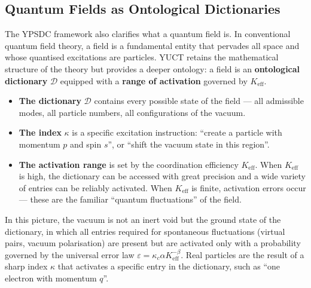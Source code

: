 \documentclass[12pt,a4paper]{article}
\theoremstyle{remark}
\begin{document}
	\medskip
	
	
	\subsection{Quantum Fields as Ontological Dictionaries}
	
	The YPSDC framework also clarifies what a quantum field is.
	In conventional quantum field theory, a field is a fundamental
	entity that pervades all space and whose quantised excitations
	are particles.  YUCT retains the mathematical structure of the
	theory but provides a deeper ontology: a field is an
	\textbf{ontological dictionary} $\mathcal{D}$ equipped with a
	\textbf{range of activation} governed by $K_{\mathrm{eff}}$.
	
	\begin{itemize}[leftmargin=*]
		\item \textbf{The dictionary} $\mathcal{D}$ contains every
		possible state of the field --- all admissible modes,
		all particle numbers, all configurations of the vacuum.
		\item \textbf{The index} $\kappa$ is a specific excitation
		instruction: ``create a particle with momentum $p$ and
		spin $s$'', or ``shift the vacuum state in this region''.
		\item \textbf{The activation range} is set by the
		coordination efficiency $K_{\mathrm{eff}}$.  When
		$K_{\mathrm{eff}}$ is high, the dictionary can be accessed
		with great precision and a wide variety of entries can be
		reliably activated.  When $K_{\mathrm{eff}}$ is finite,
		activation errors occur --- these are the familiar
		``quantum fluctuations'' of the field.
	\end{itemize}
	
	In this picture, the vacuum is not an inert void but the ground
	state of the dictionary, in which all entries required for
	spontaneous fluctuations (virtual pairs, vacuum polarisation) are
	present but are activated only with a probability governed by the
	universal error law $\varepsilon = \kappa_c \alpha K_{\mathrm{eff}}^{-\beta}$.
	Real particles are the result of a sharp index $\kappa$ that
	activates a specific entry in the dictionary, such as ``one
	electron with momentum $q$''.
	
\end{document}
